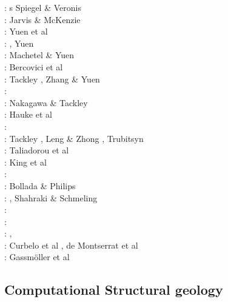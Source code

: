 \begin{scriptsize}
\nineteensixty: s Spiegel \& Veronis \cite{spve60}\\
\nineteeneighty: Jarvis \& McKenzie \cite{jamc80}\\
\nineteeneightyseven:  Yuen et al \cite{yuqh87}\\
\nineteeneightyeight: \cite{glat88}, Yuen \etal{} \cite{yuzl88} \\
\nineteeneightynine: Machetel \& Yuen \cite{mayu89} \\
\nineteenninetytwo: Bercovici et al \cite{besg92}\\
\nineteenninetysix: Tackley \cite{tack96}, Zhang \& Yuen \cite{zhyu96}\\
\nineteenninetyeight: \cite{mite98} \\
\twothousandfour: Nakagawa \& Tackley \cite{nata04}\\
\twothousandfive: Hauke et al \cite{halg05a,halg05b}\\
\twothousandseven: \cite{feku07} \\
\twothousandeight: Tackley \cite{tack08}, Leng \& Zhong \cite{lezh08}, Trubitsyn \cite{trub08}\\
\twothousandnine: Taliadorou et al \cite{tagm09} \\
\twothousandten: King et al \cite{kilv10}\\
\twothousandeleven: \cite{talz11}\\
\twothousandtwelve: Bollada \& Philips \cite{boph12}\\
\twothousandthirteen: \cite{lizh13}, Shahraki \& Schmeling \cite{shsc13}\\
\twothousandfifteen: \cite{kamo15}\\
\twothousandsixteen: \cite{ghbu16}\\
\twothousandeighteen: \cite{cogb18}, \cite{ghbu18}\\
\twothousandnineteen: Curbelo et al \cite{cuda19}, de Montserrat et al \cite{demh19}\\
\twothousandtwenty: Gassm{\"o}ller et al \cite{gadb20}
\end{scriptsize}

\subsection{Computational Structural geology}

